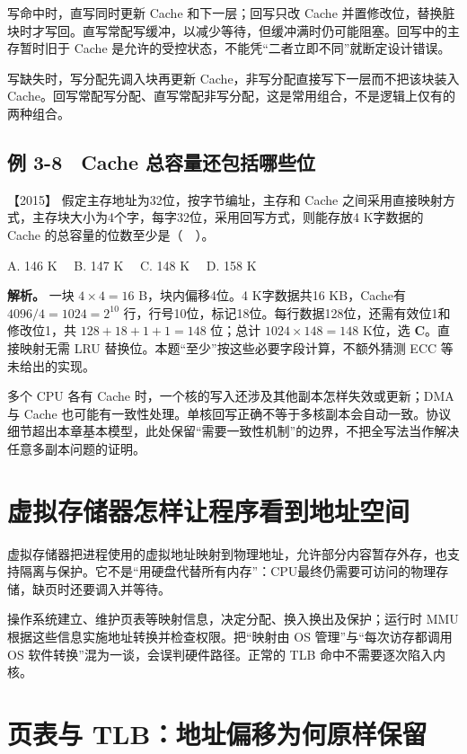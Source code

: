 写命中时，直写同时更新 Cache 和下一层；回写只改 Cache 并置修改位，替换脏块时才写回。直写常配写缓冲，以减少等待，但缓冲满时仍可能阻塞。回写中的主存暂时旧于 Cache 是允许的受控状态，不能凭``二者立即不同''就断定设计错误。

写缺失时，写分配先调入块再更新 Cache，非写分配直接写下一层而不把该块装入 Cache。回写常配写分配、直写常配非写分配，这是常用组合，不是逻辑上仅有的两种组合。

\subsection{例 3-8　Cache 总容量还包括哪些位}\label{co-ex3-8}

\noindent{}【2015】 假定主存地址为32位，按字节编址，主存和 Cache 之间采用直接映射方式，主存块大小为4个字，每字32位，采用回写方式，则能存放4 K字数据的 Cache 的总容量的位数至少是（　）。

A. 146 K　 B. 147 K　 C. 148 K　 D. 158 K


\textbf{解析。} 一块 \(4\times4=16\) B，块内偏移4位。4 K字数据共16 KB，Cache有 \(4096/4=1024=2^{10}\) 行，行号10位，标记18位。每行数据128位，还需有效位1和修改位1，共 \(128+18+1+1=148\) 位；总计 \(1024\times148=148\) K位，选 \textbf{C}。直接映射无需 LRU 替换位。本题``至少''按这些必要字段计算，不额外猜测 ECC 等未给出的实现。

多个 CPU 各有 Cache 时，一个核的写入还涉及其他副本怎样失效或更新；DMA 与 Cache 也可能有一致性处理。单核回写正确不等于多核副本会自动一致。协议细节超出本章基本模型，此处保留``需要一致性机制''的边界，不把全写法当作解决任意多副本问题的证明。

\section{虚拟存储器怎样让程序看到地址空间}\label{co-03-11}

虚拟存储器把进程使用的虚拟地址映射到物理地址，允许部分内容暂存外存，也支持隔离与保护。它不是``用硬盘代替所有内存''：CPU最终仍需要可访问的物理存储，缺页时还要调入并等待。

操作系统建立、维护页表等映射信息，决定分配、换入换出及保护；运行时 MMU 根据这些信息实施地址转换并检查权限。把``映射由 OS 管理''与``每次访存都调用 OS 软件转换''混为一谈，会误判硬件路径。正常的 TLB 命中不需要逐次陷入内核。

\section{页表与 TLB：地址偏移为何原样保留}\label{co-03-12}

